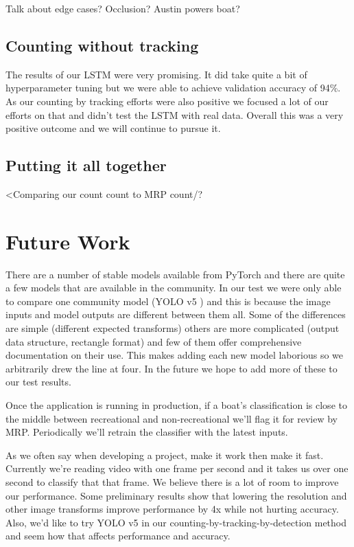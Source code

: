 \documentclass[10pt,twocolumn,letterpaper]{article}
\begin{document}
Talk about edge cases? Occlusion? Austin powers boat?

\subsection{Counting without tracking}

The results of our LSTM were very promising. It did take quite a bit of hyperparameter tuning but we were able to achieve validation accuracy of 94\%. As our counting by tracking efforts were also positive we focused a lot of our efforts on that and didn't test the LSTM with real data. Overall this was a very positive outcome and we will continue to pursue it.

\subsection{Putting it all together}

<Comparing our count count to MRP count/?

\section{Future Work}

There are a number of stable models available from PyTorch and there are quite a few models that are available in the community. In our test we were only able to compare one community model (YOLO v5 \cite{pytorch_yolov5}) and this is because the image inputs and model outputs are different between them all. Some of the differences are simple (different expected transforms) others are more complicated (output data structure, rectangle format) and few of them offer comprehensive documentation on their use. This makes adding each new model laborious so we arbitrarily drew the line at four. In the future we hope to add more of these to our test results.

Once the application is running in production, if a boat's classification is close to the middle between recreational and non-recreational we'll flag it for review by MRP. Periodically we'll retrain the classifier with the latest inputs.

As we often say when developing a project, make it work then make it fast. Currently we're reading video with one frame per second and it takes us over one second to classify that that frame. We believe there is a lot of room to improve our performance. Some preliminary results show that lowering the resolution and other image transforms improve performance by 4x while not hurting accuracy. Also, we'd like to try YOLO v5 in our counting-by-tracking-by-detection method and seem how that affects performance and accuracy.
\end{document}
